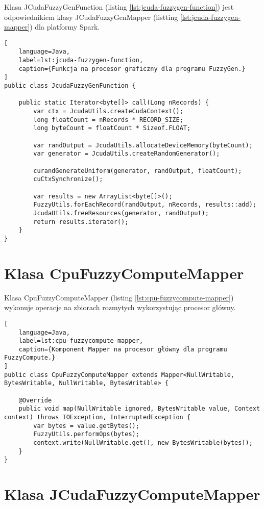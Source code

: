 Klasa JCudaFuzzyGenFunction (listing \ref{lst:jcuda-fuzzygen-function}) jest odpowiednikiem
klasy JCudaFuzzyGenMapper (listting \ref{lst:jcuda-fuzzygen-mapper}) dla platformy Spark.

\begin{lstlisting}[
    language=Java,
    label=lst:jcuda-fuzzygen-function,
    caption={Funkcja na procesor graficzny dla programu FuzzyGen.}
]
public class JcudaFuzzyGenFunction {

    public static Iterator<byte[]> call(Long nRecords) {
        var ctx = JcudaUtils.createCudaContext();
        long floatCount = nRecords * RECORD_SIZE;
        long byteCount = floatCount * Sizeof.FLOAT;

        var randOutput = JcudaUtils.allocateDeviceMemory(byteCount);
        var generator = JcudaUtils.createRandomGenerator();

        curandGenerateUniform(generator, randOutput, floatCount);
        cuCtxSynchronize();

        var results = new ArrayList<byte[]>();
        FuzzyUtils.forEachRecord(randOutput, nRecords, results::add);
        JcudaUtils.freeResources(generator, randOutput);
        return results.iterator();
    }
}
\end{lstlisting}
\newpage

\section*{Klasa CpuFuzzyComputeMapper} \label{ch:cpu-fuzzycompute-mapper}

Klasa CpuFuzzyComputeMapper (listing \ref{lst:cpu-fuzzycompute-mapper}) wykonuje operacje na zbiorach rozmytych wykorzystując procesor główny.

\begin{lstlisting}[
    language=Java,
    label=lst:cpu-fuzzycompute-mapper,
    caption={Komponent Mapper na procesor główny dla programu FuzzyCompute.}
]
public class CpuFuzzyComputeMapper extends Mapper<NullWritable, BytesWritable, NullWritable, BytesWritable> {

    @Override
    public void map(NullWritable ignored, BytesWritable value, Context context) throws IOException, InterruptedException {
        var bytes = value.getBytes();
        FuzzyUtils.performOps(bytes);
        context.write(NullWritable.get(), new BytesWritable(bytes));
    }
}
\end{lstlisting}
\newpage

\section*{Klasa JCudaFuzzyComputeMapper} \label{ch:jcuda-fuzzycompute-mapper}

